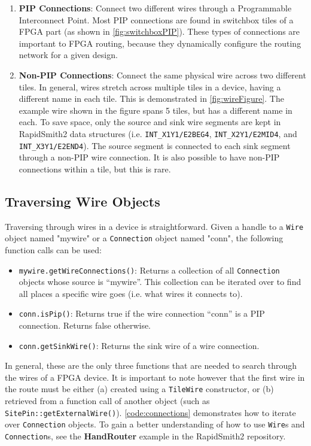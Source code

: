 \begin {enumerate}
  \item \textbf{PIP Connections}: Connect two different wires through a
  Programmable Interconnect Point. Most PIP connections are found in
  switchbox tiles of a FPGA part (as shown in \autoref{fig:switchboxPIP}).
  These types of connections are important to FPGA routing, because they
  dynamically configure the routing network for a given design.
   
  \item \textbf{Non-PIP Connections}: Connect the same physical wire across two
  different tiles. In general, wires stretch across multiple tiles in a device, having
  a different name in each tile. This is demonstrated in
  \autoref{fig:wireFigure}. The example wire shown in the figure spans 5
  tiles, but has a different name in each. To save space, only the
  source and sink wire segments are kept in RapidSmith2 data structures
  (i.e. \texttt{INT\_X1Y1/E2BEG4}, \texttt{INT\_X2Y1/E2MID4}, and
  \texttt{INT\_X3Y1/E2END4}). The source segment is connected to each sink
  segment through a non-PIP wire connection. It is also possible to have non-PIP
  connections within a tile, but this is rare.
\end{enumerate} 


\subsection{Traversing Wire Objects}
Traversing through wires in a device is straightforward. Given a handle to a
\texttt{Wire} object named "mywire" or a \texttt{Connection} object named
"conn", the following function calls can be used:

\begin {itemize}
  \item \texttt{mywire.getWireConnections()}: Returns a collection of all
  \texttt{Connection} objects whose source is ``mywire''. This collection can
  be iterated over to find all places a specific wire goes (i.e. what wires it
  connects to).
  \item  \texttt{conn.isPip()}: Returns true if the wire connection ``conn'' is
  a PIP connection. Returns false otherwise.
  \item \texttt{conn.getSinkWire()}: Returns the sink wire of a wire connection.
\end{itemize} 

\noindent
In general, these are the only three functions that are needed to
search through the wires of a FPGA device. It is important to note however that
the first wire in the route must be either (a) created using a \texttt{TileWire}
constructor, or (b) retrieved from a function call of another object (such as
\texttt{SitePin::getExternalWire()}). \autoref{code:connections} demonstrates
how to iterate over \texttt{Connection} objects. To gain a better
understanding of how to use \texttt{Wire}s and \texttt{Connection}s, see the
\textbf{HandRouter} example in the RapidSmith2 repository.

